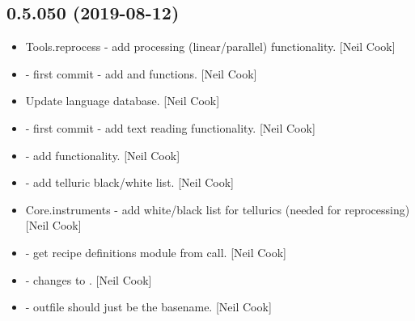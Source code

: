 \documentclass[a4paper,10pt,english]{report}
\begin{document}
\subsection{0.5.050 (2019-08-12)}
\label{\detokenize{misc/changelog:id93}}\begin{itemize}
\item {} 
Tools.reprocess - add processing (linear/parallel) functionality.
{[}Neil Cook{]}

\item {} 
 - first commit - add  and
 functions. {[}Neil Cook{]}

\item {} 
Update language database. {[}Neil Cook{]}

\item {} 
 - first commit - add text reading functionality. {[}Neil
Cook{]}

\item {} 
 - add  functionality. {[}Neil Cook{]}

\item {} 
 - add telluric black/white list. {[}Neil
Cook{]}

\item {} 
Core.instruments - add white/black list for tellurics (needed for
reprocessing) {[}Neil Cook{]}

\item {} 
 - get recipe definitions module from call.
{[}Neil Cook{]}

\item {} 
 - changes to . {[}Neil Cook{]}

\item {} 
 - outfile should just be the basename. {[}Neil
Cook{]}

\end{itemize}
\end{document}
